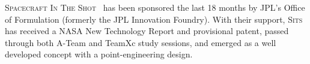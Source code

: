 \documentclass{tufte-handout}
\newcommand{\sitslong}[0]{\textsc{Spacecraft In The Shot}}%
\newcommand{\sitsshort}[0]{\textsc{Sits}}%
\begin{document}
\clearpage
\sitslong~ has been sponsored the last 18 months by JPL's Office of 
Formulation (formerly the JPL Innovation Foundry). With their support, 
\sitsshort~ has received a NASA New Technology Report and provisional patent, passed through both 
A-Team and TeamXc study sessions, and emerged as a well developed concept 
with a point-engineering design.



\end{document}
